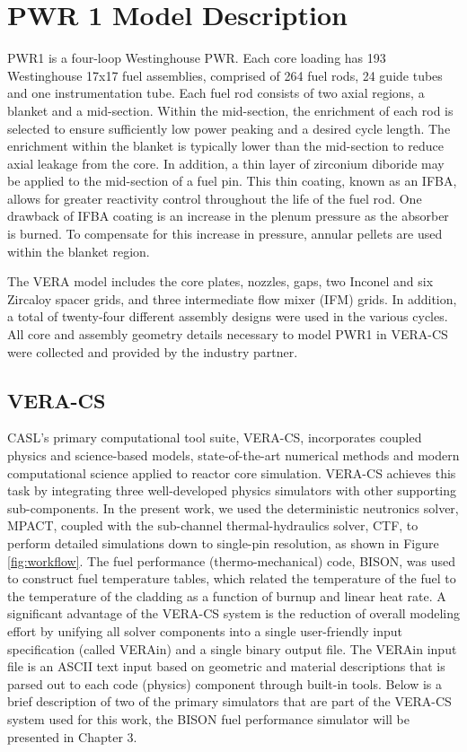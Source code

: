 \documentclass[edeposit,fullpage,11pt]{uiucthesis2009}
\begin{document}
\section{PWR 1 Model Description}
PWR1 is a four-loop Westinghouse PWR.
Each core loading has 193 Westinghouse 17x17 fuel assemblies, comprised of 264 fuel rods, 24 guide tubes and one instrumentation tube. 
Each fuel rod consists of two axial regions, a blanket and a mid-section. 
Within the mid-section, the enrichment of each rod is selected to ensure sufficiently low power peaking and a desired cycle length. 
The enrichment within the blanket is typically lower than the mid-section to reduce axial leakage from the core. 
In addition, a thin layer of zirconium diboride may be applied to the mid-section of a fuel pin. 
This thin coating, known as an \gls{IFBA}, allows for greater reactivity control throughout the life of the fuel rod. 
One drawback of IFBA coating is an increase in the plenum pressure as the absorber is burned. 
To compensate for this increase in pressure, annular pellets are used within the blanket region. 

The VERA model includes the core plates, nozzles, gaps, two Inconel and six Zircaloy spacer grids, and three intermediate flow mixer (IFM) grids. 
In addition, a total of twenty-four different assembly designs were used in the various cycles. 
All core and assembly geometry details necessary to model PWR1 in VERA-CS were collected and provided by the industry partner.


\subsection{VERA-CS}
\gls{CASL}'s primary computational tool suite, VERA-CS, incorporates coupled physics and science-based models, state-of-the-art numerical methods and modern computational science applied to reactor core simulation. 
VERA-CS achieves this task by integrating three well-developed physics simulators with other supporting sub-components. 
In the present work, we used the deterministic neutronics solver, MPACT, coupled with the sub-channel thermal-hydraulics solver, CTF, to perform detailed simulations down to single-pin resolution, as shown in Figure \ref{fig:workflow}.
The fuel performance (thermo-mechanical) code, BISON, was used to construct fuel temperature tables, which related the temperature of the fuel to the temperature of the cladding as a function of burnup and linear heat rate.  
A significant advantage of the VERA-CS system is the reduction of overall modeling effort by unifying all solver components into a single user-friendly input specification (called VERAin) and a single binary output file.
The VERAin input file is an ASCII text input based on geometric and material descriptions that is parsed out to each code (physics) component through built-in tools. 
Below is a brief description of two of the primary simulators that are part of the VERA-CS system used for this work, the BISON fuel performance simulator will be presented in Chapter 3.
\end{document}
